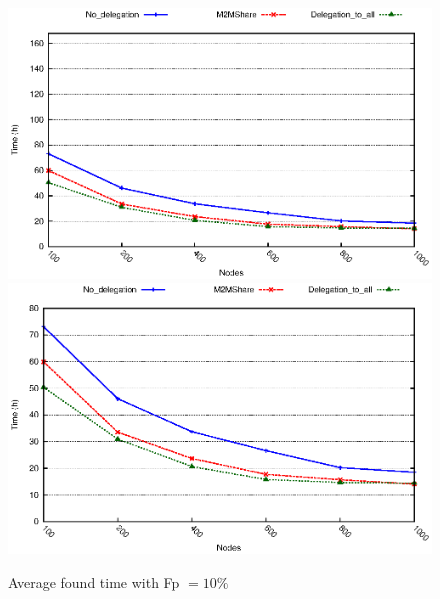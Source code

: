 \begin{figure}[htbp]
\centering%
\subfigure%
{\includegraphics{grafici/tempiVF_Fp10.eps}}\qquad\qquad
\subfigure%
{\includegraphics{grafici/tempiVF_Fp10_zoom.eps}}
\caption{Average found time with Fp $= 10\%$\label{graficiTempiVF_Fp10}}
\end{figure}

